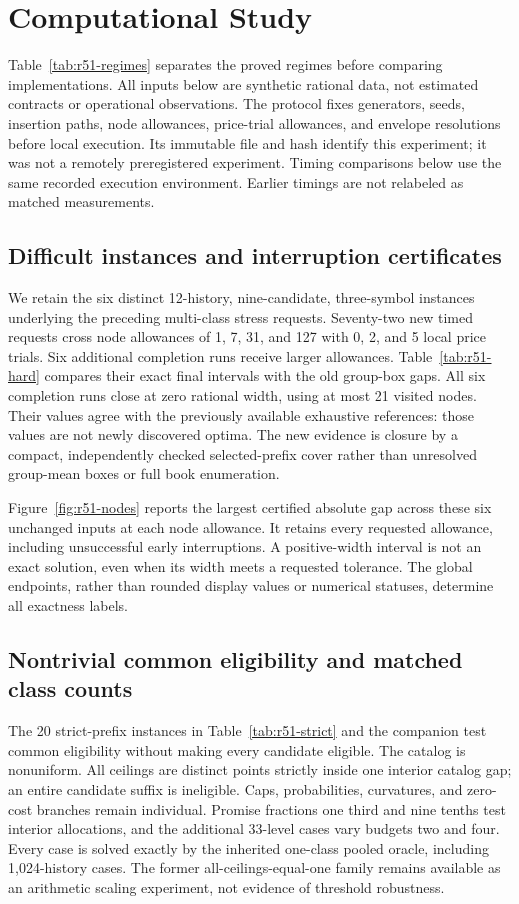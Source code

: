 \section{Computational Study}\label{sec:r51-study}
Table~\ref{tab:r51-regimes} separates the proved regimes before comparing implementations. All inputs below are synthetic rational data, not estimated contracts or operational observations. The protocol fixes generators, seeds, insertion paths, node allowances, price-trial allowances, and envelope resolutions before local execution. Its immutable file and hash identify this experiment; it was not a remotely preregistered experiment. Timing comparisons below use the same recorded execution environment. Earlier timings are not relabeled as matched measurements.

\subsection{Difficult instances and interruption certificates}
We retain the six distinct 12-history, nine-candidate, three-symbol instances underlying the preceding multi-class stress requests. Seventy-two new timed requests cross node allowances of 1, 7, 31, and 127 with 0, 2, and 5 local price trials. Six additional completion runs receive larger allowances. Table~\ref{tab:r51-hard} compares their exact final intervals with the old group-box gaps. All six completion runs close at zero rational width, using at most 21 visited nodes. Their values agree with the previously available exhaustive references: those values are not newly discovered optima. The new evidence is closure by a compact, independently checked selected-prefix cover rather than unresolved group-mean boxes or full book enumeration.

Figure~\ref{fig:r51-nodes} reports the largest certified absolute gap across these six unchanged inputs at each node allowance. It retains every requested allowance, including unsuccessful early interruptions. A positive-width interval is not an exact solution, even when its width meets a requested tolerance. The global endpoints, rather than rounded display values or numerical statuses, determine all exactness labels.


\subsection{Nontrivial common eligibility and matched class counts}
The 20 strict-prefix instances in Table~\ref{tab:r51-strict} and the companion test common eligibility without making every candidate eligible. The catalog is nonuniform. All ceilings are distinct points strictly inside one interior catalog gap; an entire candidate suffix is ineligible. Caps, probabilities, curvatures, and zero-cost branches remain individual. Promise fractions one third and nine tenths test interior allocations, and the additional 33-level cases vary budgets two and four. Every case is solved exactly by the inherited one-class pooled oracle, including 1,024-history cases. The former all-ceilings-equal-one family remains available as an arithmetic scaling experiment, not evidence of threshold robustness.

